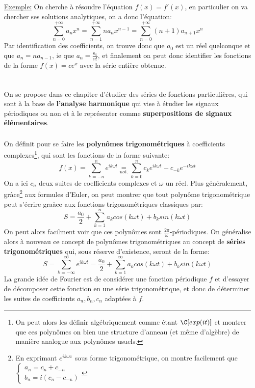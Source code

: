\uline{Exemple:} On cherche à résoudre l'équation \(f(x) = f'(x)\), en particulier on va chercher ses solutions analytiques, on a donc l'équation:
\[
   \sum_{n=0}^{+\infty}a_nx^n = \sum_{n=1}^{+\infty}na_nx^{n-1} = \sum_{n=0}^{+\infty}(n+1)a_{n+1}x^{n}
\]
Par identification des coefficients, on trouve donc que \(a_0\) est un réel quelconque et que \(a_n = na_{n-1}\), ie que \(a_n = \frac{a_0}{n!}\), et finalement on peut donc identifier les fonctions de la forme \(f(x) = ce^x\) avec la série entière obtenue.
\chapter*{}
On se propose dans ce chapitre d'étudier des séries de fonctions particulières, qui sont à la base de \textbf{l'analyse harmonique} qui vise à étudier les signaux périodiques ou non et à le représenter comme \textbf{superpositions de signaux élémentaires}.

\subsection*{}
On définit pour se faire les \textbf{polynômes trigonométriques} à coefficients complexes\footnote[1]{On peut alors les définir algébriquement comme étant \(\C[exp(it)]\) et montrer que ces polynômes on bien une structure d'anneau (et même d'algèbre) de manière analogue aux polynômes usuels.}, qui sont les fonctions de la forme suivante:
\[
   f(x) = \sum_{k=-n}^{n} e^{ik\omega t} \underset{not.}{=} \sum_{k = 0}^{n} c_k e^{ik\omega t} + c_{-k}e^{-ik\omega t}    
\]
On a ici \(c_n\) deux suites de coefficients complexes et \(\omega\) un réel. Plus généralement, gràce\footnote[2]{En exprimant \(e^{ik\omega x}\) sous forme trigonométrique, on montre facilement que \(\begin{cases} a_n = c_n + c_{-n} \\ b_n = i(c_n - c_{-n}) \end{cases}\)} aux formules d'Euler, on peut montrer que tout polynôme trigonométrique peut s'écrire graàce aux fonctions trigonométriques classiques par:
\[
   S = \frac{a_0}{2} + \sum_{k=1}^{n} a_kcos(k\omega t) + b_ksin(k\omega t)   
\]
On peut alors facilment voir que ces polynômes sont \(\frac{2\pi}{\omega}\)-périodiques. On généralise alors à nouveau ce concept de polynômes trigonométriques au concept de \textbf{séries trigonométriques} qui, sous réserve d'existence, seront de la forme:
\[
   S = \sum_{k=-\infty}^{\infty} e^{ik\omega t} = \frac{a_0}{2} + \sum_{k=1}^{\infty} a_kcos(k\omega t) + b_ksin(k\omega t)
\]
La grande idée de Fourier est de considérer une fonction périodique \(f\) et d'essayer de décomposer cette fonction en une série trigonométrique, et donc de déterminer les suites de coefficients \(a_n, b_n, c_n\) adaptées à \(f\).

